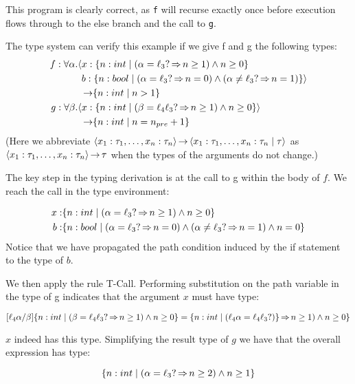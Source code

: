 \documentclass[runningheads]{llncs}
\begin{document}
This program is clearly correct, as \lstinline{f} will recurse exactly once before execution
flows through to the else branch and the call to \lstinline{g}.

The type system can verify this example if we give f and g the following types:
\begin{align*}
  f: \forall \alpha.\langle&x: \{ n : int \mid (\alpha = \ell_3? \operatorname{\Rightarrow} n \geq 1) \wedge n \geq 0 \} \\
                           &b: \{ n: bool \mid (\alpha = \ell_3? \operatorname{\Rightarrow} n = 0) \wedge (\alpha \neq \ell_3? \operatorname{\Rightarrow} n = 1) \}\rangle \\
                           & \operatorname{\rightarrow} \{ n : int \mid n > 1 \} \\
  g: \forall \beta.\langle&x: \{ n : int \mid (\beta = \ell_4\ell_3? \operatorname{\Rightarrow} n \geq 1) \wedge n \geq 0 \}\rangle \\
                           & \operatorname{\rightarrow} \{ n: int \mid n = n_{pre} + 1\}
\end{align*}
(Here we abbreviate $\left\langle{x_1:\tau_1,\ldots,x_n:\tau_n}\right\rangle \operatorname{\rightarrow} \left\langle{x_1:\tau_1,\ldots,x_n:\tau_n\mid \tau}\right\rangle$ as $\left\langle{x_1:\tau_1,\ldots,x_n:\tau_n}\right\rangle \operatorname{\rightarrow} \tau$ when the types of the arguments
do not change.)

The key step in the typing derivation is at the call to g within the body of $f$. We reach the
call in the type environment:

\begin{align*}
  x: & \{ n : int \mid (\alpha = \ell_3? \operatorname{\Rightarrow} n \geq 1) \wedge n \geq 0 \} \\
  b: & \{ n: bool \mid (\alpha = \ell_3? \operatorname{\Rightarrow} n = 0) \wedge (\alpha \neq \ell_3? \operatorname{\Rightarrow} n = 1) \wedge n = 0 \}
\end{align*}
Notice that we have propagated the path condition induced by the if
statement to the type of $b$.

We then apply the rule T-Call. Performing substitution on the path variable in the type
of g indicates that the argument $x$ must have type:

\[
  [\ell_4\alpha/\beta]\{ n : int \mid (\beta = \ell_4\ell_3? \operatorname{\Rightarrow} n \geq 1) \wedge n \geq 0 \} = \{ n : int \mid (\ell_4\alpha = \ell_4\ell_3?)\} \operatorname{\Rightarrow} n \geq 1) \wedge n \geq 0 \}
\]

$x$ indeed has this type. Simplifying the result type of $g$ we have that the overall expression has type:

\[
  \{ n : int \mid (\alpha = \ell_3? \operatorname{\Rightarrow} n \geq 2) \wedge n \geq 1 \}
\]
\end{document}
